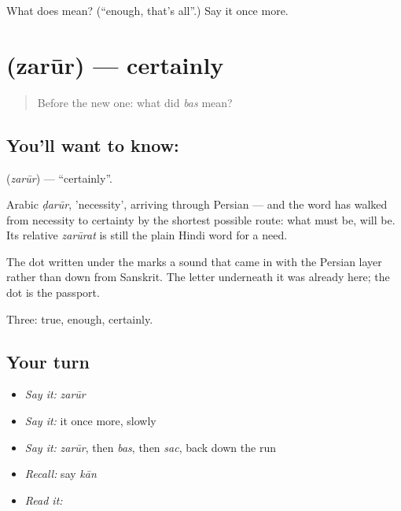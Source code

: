 \begin{tcolorbox}[breakable,colback=teal!4,colframe=teal!35!black,title={Before you move on}]
What does  mean? (\textquotedblleft{}enough, that's all\textquotedblright{}.) Say it once more.
\end{tcolorbox}
\section[\texorpdfstring{\hi{ज़रूर} (zarūr)}{ज़रूर (zarūr)}]{ (zarūr) — certainly}

\label{lesson:HI-C48-certainly}



\begin{quote}
Before the new one: what did \emph{bas} mean?
\end{quote}

\subsection*{You'll want to know: }
\textbf{} (\emph{zarūr}) — \textquotedblleft{}certainly\textquotedblright{}.

Arabic \emph{ḍarūr}, 'necessity', arriving through Persian — and the word has walked from necessity to certainty by the shortest possible route: what must be, will be. Its relative \emph{zarūrat} is still the plain Hindi word for a need.

The dot written under the  marks a sound that came in with the Persian layer rather than down from Sanskrit. The letter underneath it was already here; the dot is the passport.

\begin{grammarlens}[title={What you've built}]
Three: true, enough, certainly.
\end{grammarlens}

\subsection*{Your turn}
\begin{itemize}
\raggedright
  \item \emph{Say it:} \emph{zarūr}
  \item \emph{Say it:} it once more, slowly
  \item \emph{Say it:} \emph{zarūr}, then \emph{bas}, then \emph{sac}, back down the run
  \item \emph{Recall:} say \emph{kān}
  \item \emph{Read it:} \textbf{}
\end{itemize}

